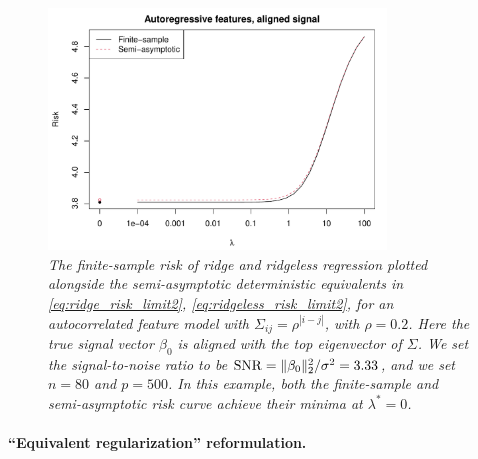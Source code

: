 \documentclass{article}
\begin{document}
\begin{figure}[tb]
\centering
\includegraphics[width=0.8\textwidth]{ridge_ar.pdf}
\caption{\it The finite-sample risk of ridge and ridgeless regression plotted
  alongside the semi-asymptotic deterministic equivalents in
  \eqref{eq:ridge_risk_limit2}, \eqref{eq:ridgeless_risk_limit2}, for an 
  autocorrelated feature model with $\Sigma_{ij} =  \rho^{|i-j|}$, with $\rho = 
  0.2$. Here the true signal vector $\beta_0$ is aligned with the top
  eigenvector of $\Sigma$. We set the signal-to-noise ratio to be $\mathrm{SNR} =
  \|\beta_0\|_2^2 / \sigma^2 = 3.33$, and we set $n = 80$ and $p = 500$. In this
  example, both the finite-sample and semi-asymptotic risk curve achieve their
  minima at $\lambda^* = 0$.}          
\label{fig:ridge_ar}
\end{figure}

\paragraph{``Equivalent regularization'' reformulation.}
\end{document}
